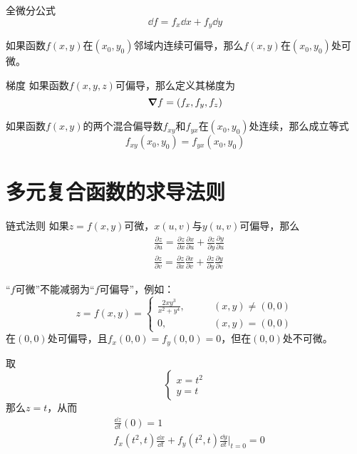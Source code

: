 \documentclass[lang = cn, scheme = chinese, thmcnt = section]{elegantbook}
\begin{document}
\begin{theorem}{全微分公式}
	$$
	\dd f
	=f_x\dd x+f_y\dd y
	$$
\end{theorem}

\begin{theorem}
	如果函数$f(x,y)$在$(x_0,y_0)$邻域内连续可偏导，那么$f(x,y)$在$(x_0,y_0)$处可微。
\end{theorem}

\begin{definition}{梯度}
	如果函数$f(x,y,z)$可偏导，那么定义其梯度为
	$$
	\grad f=(f_x,f_y,f_z)
	$$
\end{definition}

\begin{theorem}
	如果函数$f(x,y)$的两个混合偏导数$f_{xy}$和$f_{yx}$在$(x_0,y_0)$处连续，那么成立等式
	$$
	f_{xy}(x_0,y_0)=f_{yx}(x_0,y_0)
	$$
\end{theorem}

\section{多元复合函数的求导法则}

\begin{theorem}{链式法则}
	如果$z=f(x,y)$可微，$x(u,v)$与$y(u,v)$可偏导，那么
	\begin{align*}
		& \frac{\partial z}{\partial u}
		=\frac{\partial z}{\partial x}\frac{\partial x}{\partial u}+
		\frac{\partial z}{\partial y}\frac{\partial y}{\partial u}\\
		& \frac{\partial z}{\partial v}
		=\frac{\partial z}{\partial x}\frac{\partial x}{\partial v}+
		\frac{\partial z}{\partial y}\frac{\partial y}{\partial v}
	\end{align*}
\end{theorem}

\begin{note}
	“$f$可微”不能减弱为“$f$可偏导”，例如：
	$$
	z=f(x,y)=\begin{cases}
		\frac{2xy^3}{x^2+y^4},\qquad & (x,y)\ne (0,0)\\
		0,\qquad & (x,y)=(0,0)
	\end{cases}
	$$
	在$(0,0)$处可偏导，且$f_x(0,0)=f_y(0,0)=0$，但在$(0,0)$处不可微。
	
	取
	$$
	\begin{cases}
		x=t^2\\y=t
	\end{cases}
	$$
	那么$z=t$，从而
	\begin{align*}
		& \frac{\dd z}{\dd t}(0)=1\\
		& f_x(t^2,t)\frac{\dd x}{\dd t}+f_y(t^2,t)\frac{\dd y}{\dd t}|_{t=0}=0
	\end{align*}
\end{note}
\end{document}

